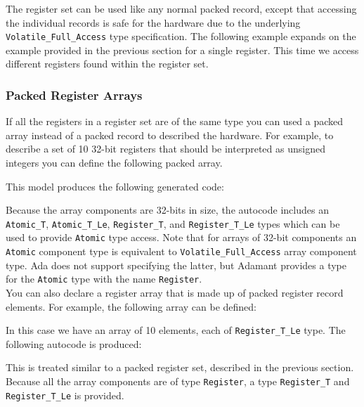 The register set can be used like any normal packed record, except that accessing the individual records is safe for the hardware due to the underlying \texttt{Volatile\_Full\_Access} type specification. The following example expands on the example provided in the previous section for a single register. This time we access different registers found within the register set.


\subsubsection{Packed Register Arrays}

If all the registers in a register set are of the same type you can used a packed array instead of a packed record to described the hardware. For example, to describe a set of 10 32-bit registers that should be interpreted as unsigned integers you can define the following packed array.


This model produces the following generated code:


Because the array components are 32-bits in size, the autocode includes an \texttt{Atomic\_T}, \texttt{Atomic\_T\_Le}, \texttt{Register\_T}, and \texttt{Register\_T\_Le} types which can be used to provide \texttt{Atomic} type access. Note that for arrays of 32-bit components an \texttt{Atomic} component type is equivalent to \texttt{Volatile\_Full\_Access} array component type. Ada does not support specifying the latter, but Adamant provides a type for the \texttt{Atomic} type with the name \texttt{Register}. \\

You can also declare a register array that is made up of packed register record elements. For example, the following array can be defined:


In this case we have an array of 10 elements, each of \texttt{Register\_T\_Le} type. The following autocode is produced:


This is treated similar to a packed register set, described in the previous section. Because all the array components are of type \texttt{Register}, a type \texttt{Register\_T} and \texttt{Register\_T\_Le} is provided. \\

